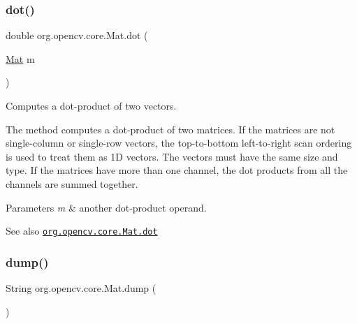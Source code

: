 \mbox{\label{classorg_1_1opencv_1_1core_1_1_mat_a053eb46b103c30891659945a6434c5db}} 
\subsubsection{\texorpdfstring{dot()}{dot()}}
{\footnotesize\ttfamily double org.\+opencv.\+core.\+Mat.\+dot (\begin{DoxyParamCaption}\item[{\mbox{\hyperlink{classorg_1_1opencv_1_1core_1_1_mat}{Mat}}}]{m }\end{DoxyParamCaption})}

Computes a dot-\/product of two vectors.

The method computes a dot-\/product of two matrices. If the matrices are not single-\/column or single-\/row vectors, the top-\/to-\/bottom left-\/to-\/right scan ordering is used to treat them as 1D vectors. The vectors must have the same size and type. If the matrices have more than one channel, the dot products from all the channels are summed together.


\begin{DoxyParams}{Parameters}
{\em m} & another dot-\/product operand.\\
\hline
\end{DoxyParams}
\begin{DoxySeeAlso}{See also}
\href{http://docs.opencv.org/modules/core/doc/basic_structures.html#mat-dot}{\tt org.\+opencv.\+core.\+Mat.\+dot} 
\end{DoxySeeAlso}
\mbox{\label{classorg_1_1opencv_1_1core_1_1_mat_a525efae06b8fcd10a0bb10e7c5a13212}} 
\subsubsection{\texorpdfstring{dump()}{dump()}}
{\footnotesize\ttfamily String org.\+opencv.\+core.\+Mat.\+dump (\begin{DoxyParamCaption}{ }\end{DoxyParamCaption})}

